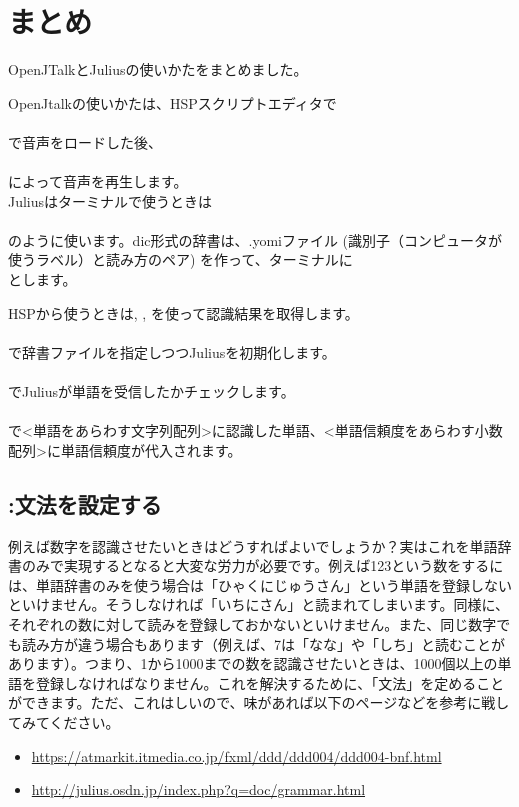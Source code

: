 \newpage
\section{まとめ}
OpenJTalkとJuliusの使いかたをまとめました。

OpenJtalkの使いかたは、HSPスクリプトエディタで\\
\\
で音声をロードした後、\\
\\
によって音声を再生します。\\

Juliusはターミナルで使うときは\\
\\
のように使います。dic形式の辞書は、.yomiファイル (識別子（コンピュータが使うラベル）と読み方のペア) を作って、ターミナルに\\
とします。

HSPから使うときは, ,  を使って認識結果を取得します。\\
\\
で辞書ファイルを指定しつつJuliusを初期化します。\\
\\
でJuliusが単語を受信したかチェックします。\\
\\
で<単語をあらわす文字列配列>に認識した単語、<単語信頼度をあらわす小数配列>に単語信頼度が代入されます。

\subsection{:文法を設定する}
例えば数字を認識させたいときはどうすればよいでしょうか？実はこれを単語辞書のみで実現するとなると大変な労力が必要です。例えば123という数をするには、単語辞書のみを使う場合は「ひゃくにじゅうさん」という単語を登録しないといけません。そうしなければ「いちにさん」と読まれてしまいます。同様に、それぞれの数に対して読みを登録しておかないといけません。また、同じ数字でも読み方が違う場合もあります（例えば、7は「なな」や「しち」と読むことがあります）。つまり、1から1000までの数を認識させたいときは、1000個以上の単語を登録しなければなりません。これを解決するために、「文法」を定めることができます。ただ、これはしいので、味があれば以下のページなどを参考に戦してみてください。
\begin{itemize}
\item \url{https://atmarkit.itmedia.co.jp/fxml/ddd/ddd004/ddd004-bnf.html}
\item \url{http://julius.osdn.jp/index.php?q=doc/grammar.html}
\end{itemize}
